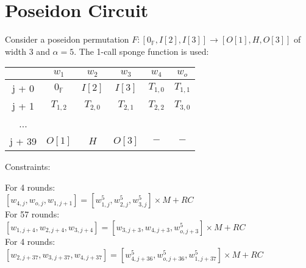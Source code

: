 \section{Poseidon Circuit}
\label{section:poseidon}
Consider a poseidon permutation $F: [0_{\mathbb{F}}, I[2], I[3]] \rightarrow [O[1], H, O[3]]$ of width $3$ and $\alpha = 5$.
The 1-call sponge function is used:
\begin{center}
\begin{tabular}{ c|c|c|c|c|c } 
  & $w_1$ & $w_2$ & $w_3$ & $w_4$ & $w_o$\\ 
 \hline
j + 0 & $0_{\mathbb{F}}$ & $I[2]$ & $I[3]$ & $T_{1,0}$ & $T_{1,1}$ \\ 
j + 1 & $T_{1,2}$ & $T_{2,0}$  & $T_{2,1}$  & $T_{2,2}$  & $T_{3,0}$ \\ 
... & & & & &\\ 
j + 39 & $O[1]$ & $H$ & $O[3]$ & $-$ & $-$\\ 
\end{tabular}
\end{center}
 Constraints:
\begin{center}
For 4 rounds: \\
$ [w_{4, j}, w_{o, j}, w_{1, j+1}] = [w_{1,j}^5, w_{2,j}^5, w_{3,j}^5] \times M + RC$ \\
For 57 rounds: \\
$ [w_{1, j +4}, w_{2, j + 4}, w_{3, j+4}] = [w_{3,j+3}, w_{4,j + 3}, w_{o,j +3}^5] \times M + RC$ \\
For 4 rounds: \\
$ [w_{2, j + 37}, w_{3, j + 37}, w_{4, j+37}] = [w_{4,j +36}^5, w_{o,j +36}^5, w_{1,j + 37}^5] \times M + RC$ \\
\end{center}
